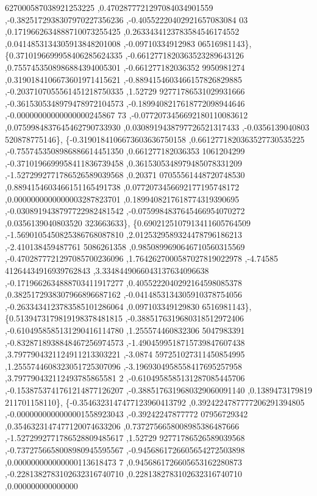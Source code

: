 \begin{DoxyCode}
      627000587038921253225 ,0.4702877721297084034901559 ,-0.3825172938307970227356236 ,-0.40552220402921657083084
      03 ,0.1719662634888710073255425 ,0.2633434123783584546174552 ,0.0414853134305913848201008 ,-0.09710334912983
      06516981143\},
\{0.3710196699958406285624335 ,-0.6612771820363523289643126 ,0.7557453508986884394005301 ,-0.661277182036352
      9950981274 ,0.3190184106673601971415621 ,-0.8894154603466157826829885 ,-0.2037107055561451218750335 ,1.52729
      92771786531029931666 ,-0.3615305348979478972104573 ,-0.1899408217618772098944646 ,-0.00000000000000000245867
      73 ,-0.0772073456692180110083612 ,0.0759984837645462790733930 ,0.0308919438797726521317433 ,-0.0356139040803
      520878775146\},
\{-0.3190184106673603636750158 ,0.6612771820363527730535225 ,-0.7557453508986886614451350 ,0.661277182036353
      1061204299 ,-0.3710196699958411836739458 ,0.3615305348979485078331209 ,-1.5272992771786526589039568 ,0.20371
      07055561448720748530 ,0.8894154603466151165491738 ,0.0772073456692177195748172 ,0.0000000000000003287823701 
      ,0.1899408217618774319390695 ,-0.0308919438797722982481542 ,-0.0759984837645466954070272 ,0.0356139040803520
      323663633\},
\{0.6902125107913411605764509 ,-1.5690105450825386768087810 ,2.0125329589324478796186213 ,-2.410138459487761
      5086261358 ,0.9850899690646710560315569 ,-0.4702877721297085700236096 ,1.7642627000587027819022978 ,-4.74585
      41264434916939762843 ,3.3348449066043137634096638 ,-0.1719662634888703411917277 ,0.4055222040292164598085378
       ,0.3825172938307966896687162 ,-0.0414853134305910378754056 ,-0.2633434123783585101286064 ,0.097103349129830
      6516981143\},
\{0.5139473179819198378481815 ,-0.3885176319680318512972406 ,-0.6104958585131290416114780 ,1.255574460832306
      5047983391 ,-0.8328718938848467256974573 ,-1.4904599518715739847607438 ,3.7977904321124911213303221 ,-3.0874
      597251027311450854995 ,1.2555744608323051725307096 ,-3.1969304958558417695257958 ,3.797790432112493785865581
      2 ,-0.6104958585131287085445706 ,-0.1538753741761214877126207 ,-0.3885176319680329060091140 ,0.1389473179819
      211701158110\},
\{-0.3546323147477123960413792 ,0.3924224787777206291394805 ,-0.0000000000000001558923043 ,-0.39242247877772
      07956729342 ,0.3546323147477120074633206 ,0.7372756658008985386487666 ,-1.5272992771786528809485617 ,1.52729
      92771786526589039568 ,-0.7372756658008980945595567 ,-0.9456861726605654272503898 ,0.000000000000000113618473
      7 ,0.9456861726605653162280873 ,-0.2281382783102632316740710 ,0.2281382783102632316740710 ,0.000000000000000

\end{DoxyCode}
